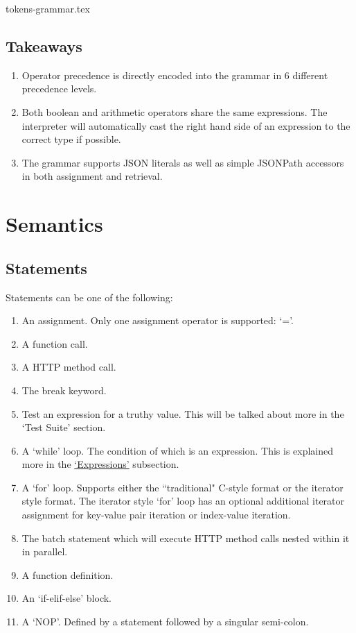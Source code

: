 {tokens-grammar.tex}

\subsection{Takeaways}

\begin{enumerate}
    \item Operator precedence is directly encoded into the grammar in 6 different precedence levels.
    \item Both boolean and arithmetic operators share the same expressions. The interpreter will automatically cast the right hand side of an expression to the correct type if possible.
    \item The grammar supports JSON literals as well as simple JSONPath accessors in both assignment and retrieval.
\end{enumerate}

\section{Semantics}

\subsection{Statements}

Statements can be one of the following:

\begin{center}
    \begin{enumerate}
        \item An assignment. Only one assignment operator is supported: `='.
        \item A function call.
        \item A HTTP method call.
        \item The break keyword.
        \item Test an expression for a truthy value. This will be talked about more in the `Test Suite' section.
        \item A `while' loop. The condition of which is an expression. This is explained more in the \hyperref[sec:expressions]{`Expressions'} subsection.
        \item A `for' loop. Supports either the ``traditional" C-style format or the iterator style format. The iterator style `for' loop has an optional additional iterator assignment for key-value pair iteration or index-value iteration.
        \item The batch statement which will execute HTTP method calls nested within it in parallel.
        \item A function definition.
        \item An `if-elif-else' block.
        \item A `NOP'. Defined by a statement followed by a singular semi-colon.
    \end{enumerate}
\end{center}

